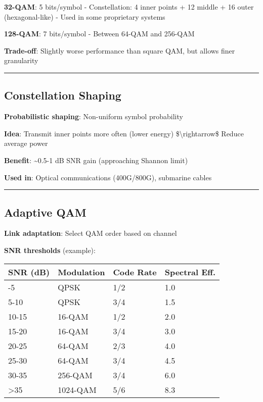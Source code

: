 \textbf{32-QAM}: 5 bits/symbol - Constellation: 4 inner points + 12
middle + 16 outer (hexagonal-like) - Used in some proprietary systems

\textbf{128-QAM}: 7 bits/symbol - Between 64-QAM and 256-QAM

\textbf{Trade-off}: Slightly worse performance than square QAM, but
allows finer granularity

\begin{center}\rule{0.5\linewidth}{0.5pt}\end{center}

\subsection{Constellation Shaping}\label{constellation-shaping}

\textbf{Probabilistic shaping}: Non-uniform symbol probability

\textbf{Idea}: Transmit inner points more often (lower energy)
\$\textbackslash rightarrow\$ Reduce average power

\textbf{Benefit}: \textasciitilde0.5-1 dB SNR gain (approaching Shannon
limit)

\textbf{Used in}: Optical communications (400G/800G), submarine cables

\begin{center}\rule{0.5\linewidth}{0.5pt}\end{center}

\subsection{Adaptive QAM}\label{adaptive-qam}

\textbf{Link adaptation}: Select QAM order based on channel

\textbf{SNR thresholds} (example):

{\def\LTcaptype{} %
\begin{longtable}[]{@{}llll@{}}
\toprule\noalign{}
SNR (dB) & Modulation & Code Rate & Spectral Eff. \\
\midrule\noalign{}
\endhead
\bottomrule\noalign{}
\endlastfoot
0-5 & QPSK & 1/2 & 1.0 \\
5-10 & QPSK & 3/4 & 1.5 \\
10-15 & 16-QAM & 1/2 & 2.0 \\
15-20 & 16-QAM & 3/4 & 3.0 \\
20-25 & 64-QAM & 2/3 & 4.0 \\
25-30 & 64-QAM & 3/4 & 4.5 \\
30-35 & 256-QAM & 3/4 & 6.0 \\
\textgreater35 & 1024-QAM & 5/6 & 8.3 \\
\end{longtable}
}

